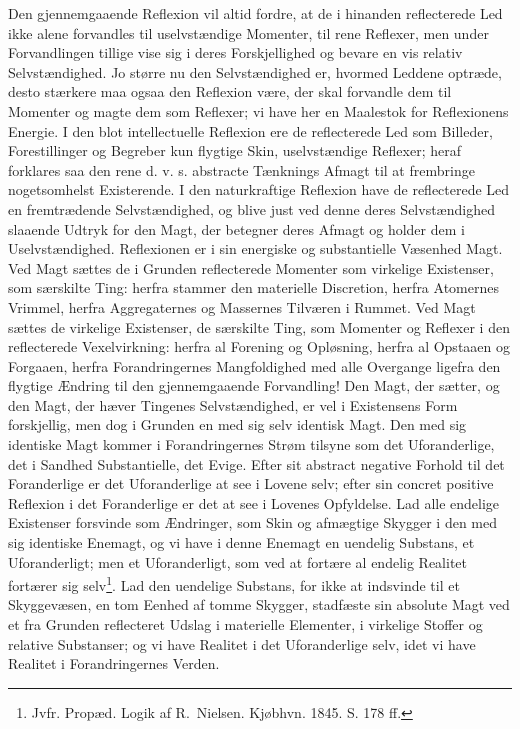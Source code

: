 \documentclass[12pt,a4paper]{book}
\begin{document}
Den gjennemgaaende Reflexion vil altid fordre, at de
i hinanden reflecterede Led ikke alene forvandles til
uselvstændige Momenter, til rene Reflexer, men under
Forvandlingen tillige vise sig i deres Forskjellighed og bevare en vis
relativ Selvstændighed. Jo større nu den Selvstændighed er,
hvormed Leddene optræde, desto stærkere maa ogsaa den
Reflexion være, der skal forvandle dem til Momenter og magte
dem som Reflexer; vi have her en Maalestok for Reflexionens
Energie. I den blot intellectuelle Reflexion ere de reflecterede
Led som Billeder, Forestillinger og Begreber kun flygtige
Skin, uselvstændige Reflexer; heraf forklares saa den rene
d. v. s. abstracte Tænknings Afmagt til at frembringe
nogetsomhelst Existerende. I den naturkraftige Reflexion have de
reflecterede Led en fremtrædende Selvstændighed, og blive just
ved denne deres Selvstændighed slaaende Udtryk for den
Magt, der betegner deres Afmagt og holder dem i
Uselvstændighed. Reflexionen er i sin energiske og substantielle
Væsenhed Magt. Ved Magt sættes de i Grunden reflecterede
Momenter som virkelige Existenser, som særskilte Ting: herfra
\setcounter{footnote}{0}
stammer den materielle Discretion, herfra Atomernes Vrimmel,
herfra Aggregaternes og Massernes Tilværen i Rummet.
Ved Magt sættes de virkelige Existenser, de særskilte Ting,
som Momenter og Reflexer i den reflecterede Vexelvirkning:
herfra al Forening og Opløsning, herfra al Opstaaen og
Forgaaen, herfra Forandringernes Mangfoldighed med alle
Overgange ligefra den flygtige Ændring til den
gjennemgaaende Forvandling! Den Magt, der sætter, og den Magt,
der hæver Tingenes Selvstændighed, er vel i Existensens
Form forskjellig, men dog i Grunden en med sig selv
identisk Magt. Den med sig identiske Magt kommer i
Forandringernes Strøm tilsyne som det Uforanderlige, det i
Sandhed Substantielle, det Evige. Efter sit abstract negative
Forhold til det Foranderlige er det Uforanderlige at see i
Lovene selv; efter sin concret positive Reflexion i det
Foranderlige er det at see i Lovenes Opfyldelse. Lad alle
endelige Existenser forsvinde som Ændringer, som Skin og
afmægtige Skygger i den med sig identiske Enemagt, og vi
have i denne Enemagt en uendelig Substans, et
Uforanderligt; men et Uforanderligt, som ved at fortære al endelig
Realitet fortærer sig selv\footnote{Jvfr. Propæd. Logik af
R.~Nielsen. Kjøbhvn. 1845. S. 178 ff.}. Lad den uendelige
Substans, for ikke at indsvinde til et Skyggevæsen, en tom
Eenhed af tomme Skygger, stadfæste sin absolute Magt ved
et fra Grunden reflecteret Udslag i materielle Elementer, i
virkelige Stoffer og relative Substanser; og vi have Realitet
i det Uforanderlige selv, idet vi have Realitet i
Forandringernes Verden.
\end{document}
